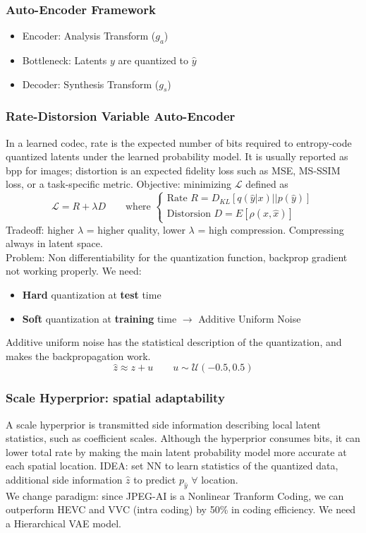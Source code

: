 \subsubsection{Auto-Encoder Framework}
\begin{itemize}
    \item Encoder: Analysis Transform ($g_a$)
    \item Bottleneck: Latents $y$ are quantized to $\hat{y}$
    \item Decoder: Synthesis Transform ($g_s$)
\end{itemize}
\subsubsection{Rate-Distorsion Variable Auto-Encoder}
In a learned codec, rate is the expected number of bits required to entropy-code quantized latents under the learned probability model. It is usually reported as bpp for images; distortion is an expected fidelity loss such as MSE, MS-SSIM loss, or a task-specific metric.
Objective: minimizing $\mathcal{L}$ defined as
$$\mathcal{L} = R + \lambda D \qquad \text{where }\begin{cases}
    \text{Rate }R = D_{KL}\left[q\left(\hat{y}|x\right)\left|\right|p\left(\hat{y}\right)\right]\\
    \text{Distorsion }D = E\left[\rho(x,\hat{x})\right] 
\end{cases}$$
Tradeoff: higher $\lambda$ = higher quality, lower $\lambda$ = high compression. Compressing always in latent space.\\
Problem: Non differentiability for the quantization function, backprop gradient not working properly. We need:
\begin{itemize}
    \item \textbf{Hard} quantization at \textbf{test} time 
    \item \textbf{Soft} quantization at \textbf{training} time $\to$ Additive Uniform Noise
\end{itemize}
Additive uniform noise has the statistical description of the quantization, and makes the backpropagation work.
$$\hat{z} \approx z + u \qquad u \sim \mathcal{U}\left(-0.5, 0.5\right)$$
\subsubsection{Scale Hyperprior: spatial adaptability}
A scale hyperprior is transmitted side information describing local latent statistics, such as coefficient scales. Although the hyperprior consumes bits, it can lower total rate by making the main latent probability model more accurate at each spatial location.
IDEA: set NN to learn statistics of the quantized data, additional side information $\hat{z}$ to predict $p_{\hat{y}}$ $\forall$ location.\\
We change paradigm: since JPEG-AI is a Nonlinear Tranform Coding, we can outperform HEVC and VVC (intra coding) by 50\% in coding efficiency. We need a Hierarchical VAE model.
